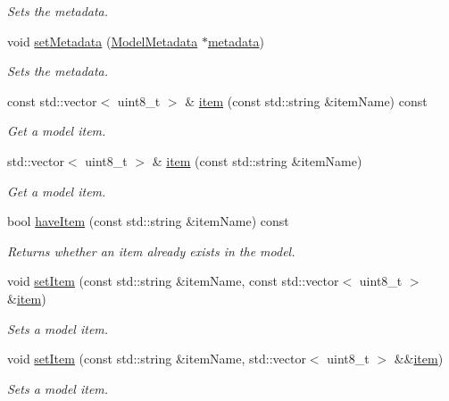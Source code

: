 \begin{DoxyCompactItemize}
\begin{DoxyCompactList}\small\item\em Sets the metadata. \end{DoxyCompactList}\item 
void \hyperlink{group___classification_module_ga24a23bab6f1de6810b2b38c67b8eac78}{set\+Metadata} (\hyperlink{classdg_1_1deepcore_1_1classification_1_1_model_metadata}{Model\+Metadata} $\ast$\hyperlink{group___classification_module_gaa88957807aa9cd63108033b376e60ef2}{metadata})
\begin{DoxyCompactList}\small\item\em Sets the metadata. \end{DoxyCompactList}\item 
const std\+::vector$<$ uint8\+\_\+t $>$ \& \hyperlink{group___classification_module_ga897ce1fbc0efb85360a6cc5ab958209d}{item} (const std\+::string \&item\+Name) const 
\begin{DoxyCompactList}\small\item\em Get a model item. \end{DoxyCompactList}\item 
std\+::vector$<$ uint8\+\_\+t $>$ \& \hyperlink{group___classification_module_ga8a80cf25a3e493dcbb32c6fcdfc1807b}{item} (const std\+::string \&item\+Name)
\begin{DoxyCompactList}\small\item\em Get a model item. \end{DoxyCompactList}\item 
bool \hyperlink{group___classification_module_gad0a0e3e9762e66bbd6b03d70011df25e}{have\+Item} (const std\+::string \&item\+Name) const 
\begin{DoxyCompactList}\small\item\em Returns whether an item already exists in the model. \end{DoxyCompactList}\item 
void \hyperlink{group___classification_module_ga8f03404f9b535950e5686b4003b20280}{set\+Item} (const std\+::string \&item\+Name, const std\+::vector$<$ uint8\+\_\+t $>$ \&\hyperlink{group___classification_module_ga897ce1fbc0efb85360a6cc5ab958209d}{item})
\begin{DoxyCompactList}\small\item\em Sets a model item. \end{DoxyCompactList}\item 
void \hyperlink{group___classification_module_ga17cdbbe5928308eb299844f4df1455ad}{set\+Item} (const std\+::string \&item\+Name, std\+::vector$<$ uint8\+\_\+t $>$ \&\&\hyperlink{group___classification_module_ga897ce1fbc0efb85360a6cc5ab958209d}{item})
\begin{DoxyCompactList}\small\item\em Sets a model item. \end{DoxyCompactList}\end{DoxyCompactItemize}
